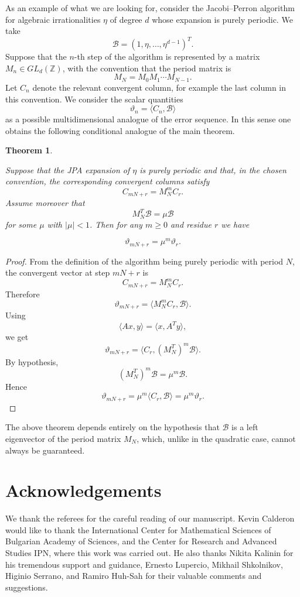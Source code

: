 \documentclass[]{interact}
\theoremstyle{plain}
\numberwithin{equation}{section} %
\newtheorem{theorem}[thm]{Theorem}
\numberwithin{table}{section} %
\numberwithin{figure}{section}
\begin{document}
As an example of what we are looking for, consider the Jacobi--Perron algorithm
for algebraic irrationalities \(\eta\) of degree \(d\) whose expansion is purely
periodic. We take
\[
\mathcal B=(1,\eta,\dots,\eta^{d-1})^T.
\]
Suppose that the \(n\)-th step of the algorithm is represented by a matrix
\(M_n\in GL_d(\mathbb Z)\), with the convention that the period matrix is
\[
M_N=M_0M_1\cdots M_{N-1}.
\]
Let \(C_n\) denote the relevant convergent column, for example the last column
in this convention. We consider the scalar quantities
\[
\vartheta_n=\langle C_n,\mathcal B\rangle
\]
as a possible multidimensional analogue of the error sequence. In this sense
one obtains the following conditional analogue of the main theorem.

\begin{theorem}\label{general}

Suppose that the JPA expansion of \(\eta\) is purely periodic and that, in the
chosen convention, the corresponding convergent columns satisfy
\[
C_{mN+r}=M_N^mC_r.
\]
Assume moreover that
\[
M_N^T\mathcal B=\mu\mathcal B
\]
for some \(\mu\) with \(|\mu|<1\). Then for any \(m\ge0\) and residue \(r\) we have

 $$\vartheta_{mN+r}=\mu^m \vartheta_{r}.$$
    
\end{theorem}

\begin{proof}
From the definition of the algorithm being purely periodic with period \(N\), the
convergent vector at step \(mN+r\) is
\[
C_{mN+r}=M_N^mC_r.
\]
Therefore
\[
\vartheta_{mN+r}
=
\langle M_N^mC_r,\mathcal B\rangle.
\]
Using
\[
\langle Ax,y\rangle=\langle x,A^Ty\rangle,
\]
we get
\[
\vartheta_{mN+r}
=
\langle C_r,(M_N^T)^m\mathcal B\rangle.
\]
By hypothesis,
\[
(M_N^T)^m\mathcal B=\mu^m\mathcal B.
\]
Hence
\[
\vartheta_{mN+r}
=
\mu^m\langle C_r,\mathcal B\rangle
=
\mu^m\vartheta_r.
\]
\end{proof}

The above theorem depends entirely on the hypothesis that \(\mathcal B\) is a
left eigenvector of the period matrix \(M_N\), which, unlike in the quadratic
case, cannot always be guaranteed.




\section*{Acknowledgements}
We thank the referees for the careful reading of our manuscript.
Kevin Calderon would like to thank the International Center for Mathematical Sciences of 
Bulgarian Academy of Sciences, and the Center for Research and Advanced Studies IPN, where this work was carried out.  He also thanks Nikita Kalinin for his tremendous support and guidance, Ernesto Lupercio, Mikhail Shkolnikov, Higinio Serrano, and Ramiro Huh-Sah for their valuable comments and suggestions. 
\end{document}
